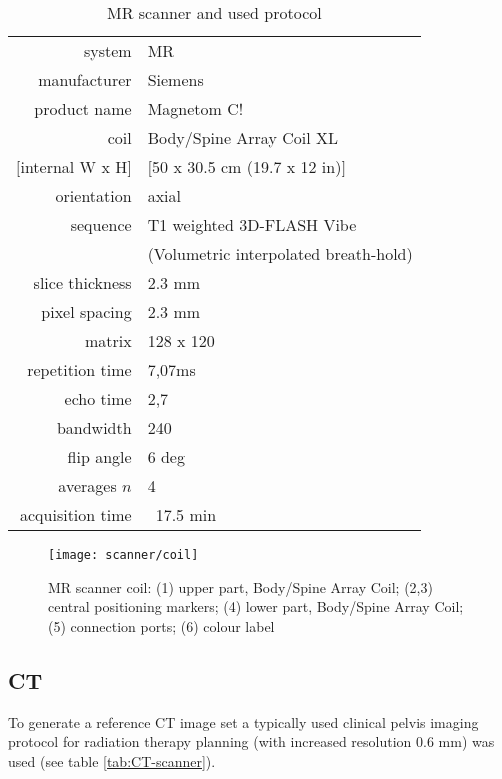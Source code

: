\begin{table}[!tbh]
\centering
\begin{tabular}{r|l}
system			& MR				\\
manufacturer	& Siemens			\\
product name	& Magnetom C!		\\
coil			& Body/Spine Array Coil XL	\\
$[$internal W x H$]$& $[$50 x 30.5 cm (19.7 x 12 in)$]$	\\
orientation		& axial	\\
sequence		& T1 weighted 3D-FLASH Vibe	\\
				& (Volumetric interpolated breath-hold)	\\
slice thickness	& 2.3 mm	\\
pixel spacing	& 2.3 mm	\\
matrix			& 128 x 120 \\
repetition time & 7,07ms	\\
echo time		& 2,7	\\
bandwidth		& 240	\\
flip angle		& 6 deg	\\
averages $n$	& 4	\\
acquisition time& ~17.5 min
\end{tabular}
\caption{MR scanner and used protocol}
\label{tab:MR-scanner}
\end{table}

\begin{figure}[tbh!]
\centering
\texttt{[image: scanner/coil]}
\caption{MR scanner coil: (1) upper part, Body/Spine Array Coil; (2,3) central positioning markers; (4) lower part, Body/Spine Array Coil; (5) connection ports; (6) colour label}
\label{fig:coil}
\end{figure}

\clearpage

\subsection{CT}
To generate a reference CT image set a typically used clinical pelvis imaging protocol for radiation therapy planning (with increased resolution 0.6 mm) was used (see table \ref{tab:CT-scanner}).


